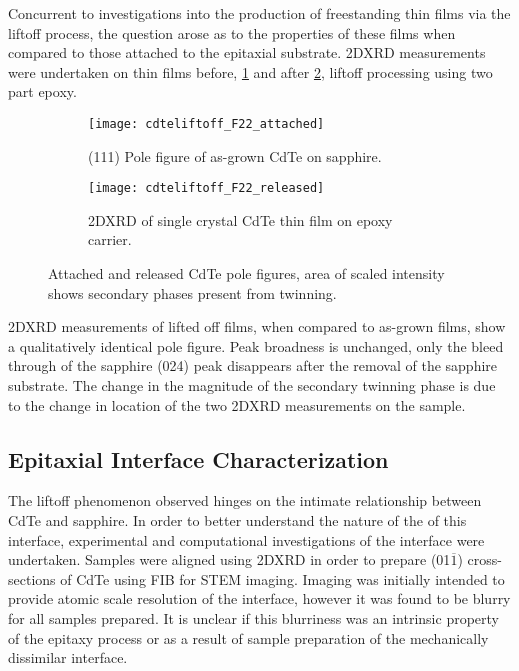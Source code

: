 Concurrent to investigations into the production of freestanding thin films via the liftoff process, the question arose as to the properties of these films when compared to those attached to the epitaxial substrate.
2DXRD measurements were undertaken on thin films before, \cref{fig:cdteliftoff_F22_attached} and after \cref{fig:cdteliftoff_F22_released}, liftoff processing using two part epoxy.
\begin{figure}
 \centering
 \begin{subfigure}[b]{0.45\textwidth}
  \centering \texttt{[image: cdteliftoff\_F22\_attached]}
  \caption{\label{fig:cdteliftoff_F22_attached}(111) Pole figure of as-grown CdTe on sapphire.}
 \end{subfigure}\quad%
 \begin{subfigure}[b]{0.45\textwidth}
  \centering \texttt{[image: cdteliftoff\_F22\_released]}
  \caption{\label{fig:cdteliftoff_F22_released}2DXRD of single crystal CdTe thin film on epoxy carrier.}
 \end{subfigure}%
 \caption{\label{fig:cdteliftoff_2DXRD}Attached and released CdTe pole figures, area of scaled intensity shows secondary phases present from twinning.}
\end{figure}
2DXRD measurements of lifted off films, when compared to as-grown films, show a qualitatively identical pole figure.
Peak broadness is unchanged, only the bleed through of the sapphire (024) peak disappears after the removal of the sapphire substrate.
The change in the magnitude of the secondary twinning phase is due to the change in location of the two 2DXRD measurements on the sample.

\subsection{Epitaxial Interface Characterization}
The liftoff phenomenon observed hinges on the intimate relationship between CdTe and sapphire.
In order to better understand the nature of the of this interface, experimental and computational investigations of the interface were undertaken.
Samples were aligned using 2DXRD in order to prepare (01\(\overline{1}\)) cross-sections of CdTe using FIB for STEM imaging.
Imaging was initially intended to provide atomic scale resolution of the interface, however it was found to be blurry for all samples prepared.
It is unclear if this blurriness was an intrinsic property of the epitaxy process or as a result of sample preparation of the mechanically dissimilar interface.

